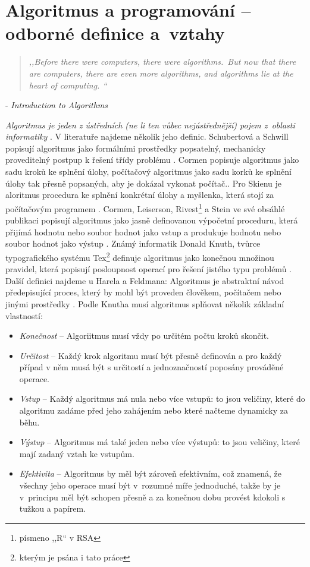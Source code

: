 \documentclass[FP,DP]{tulthesis}
\newcommand{\ahoj}[2]{\begin{quotation} \textit{#1} \end{quotation} \begin{flushright} - \textit{#2}\end{flushright} }
\begin{document}
\section{Algoritmus a programování -- odborné definice a~vztahy}
\ahoj{,,Before there were computers, there were algorithms.~But now that there are computers,
there are even more algorithms, and algorithms lie at the heart of computing. ``}{Introduction to Algorithms}

\textit {Algoritmus je jeden z ústředních (ne li ten vůbec nejústřednější) pojem z~oblasti informatiky} \citep*{didaktikderinformatik}. V literatuře najdeme několik jeho definic. Schubertová a Schwill popisují algoritmus jako formálními prostředky popsatelný, mechanicky proveditelný postpup k řešení třídy problému \citeyearpar[s.~4]{didaktikderinformatik}. Cormen popisuje algoritmus jako sadu kroků ke splnění úlohy, počítačový algoritmus jako sadu korků ke splnění úlohy tak přesně popsaných, aby je dokázal vykonat počítač.\citeyearpar[s.~1]{algunlocked}. Pro Skienu je aloritmus procedura ke splnění konkrétní úlohy a myšlenka, která stojí za počítačovým programem \citeyearpar[s.~3]{algdesignman}. Cormen, Leiserson, Rivest\footnote{písmeno ,,R`` v RSA} a Stein ve své obsáhlé publikaci popisují algoritmus jako jasně definovanou výpočetní proceduru, která přijímá hodnotu nebo soubor hodnot jako vstup a produkuje hodnotu nebo soubor hodnot jako výstup \citeyearpar[s.~5]{intralg}. Známý informatik  Donald Knuth, tvůrce typografického systému Tex\footnote{kterým je psána i tato práce} definuje algoritmus jako konečnou množinou pravidel, která popisují posloupnost operací pro řešení jistého typu problémů \citeyearpar[s.~5]{knuth}. Další definici najdeme u Harela a Feldmana: Algoritmus je abstraktní  návod předepisující proces, který by mohl být proveden člověkem, počítačem nebo jinými prostředky  \citeyearpar[s.~XII]{spirit}. 
Podle Knutha \citeyearpar[s.~4-6]{knuth} musí algoritmus splňovat několik základní vlastností:
 \begin{itemize}
\setlength\itemsep{0.1em}
\item \textit {Konečnost} -- Algoriitmus musí vždy po určitém počtu kroků skončit.
\item \textit {Určitost} -- Každý krok algoritmu musí být přesně definován a pro každý případ v něm musá být s určitostí a jednoznačností poposány prováděné operace.
\item \textit {Vstup} -- Každý algoritmus má nula nebo více vstupů: to jsou veličiny, které do algoritmu zadáme před jeho zahájením nebo které načteme dynamicky za běhu.
\item \textit {Výstup} -- Algoritmus má také jeden nebo více výstupů: to jsou veličiny, které mají zadaný vztah ke vstupům.
\item \textit {Efektivita} -- Algoritmus by měl být zároveň efektivním, což znamená, že všechny jeho operace musí být v~rozumné míře jednoduché, takže by je v~principu měl být schopen přesně a za konečnou dobu provést kdokoli s tužkou a papírem.
\end{itemize}
\end{document}
